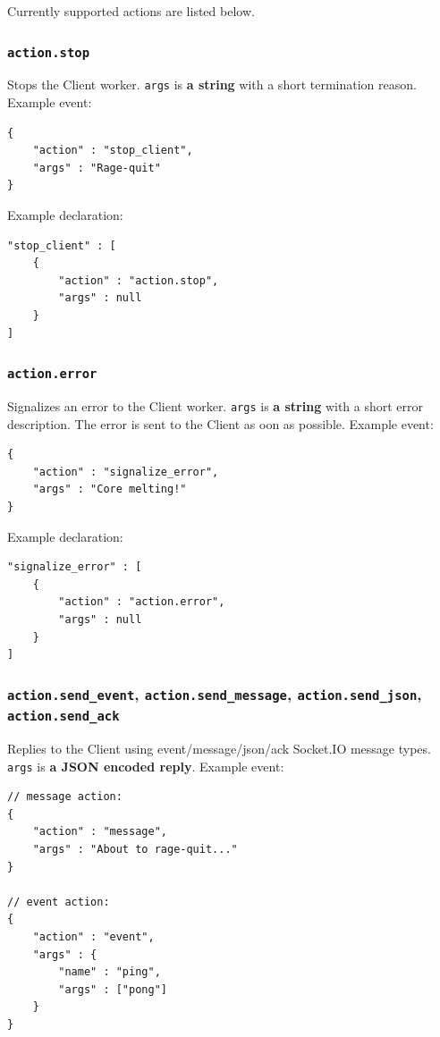 \documentclass[a4paper]{article}
\begin{document}
\noindent
Currently supported actions are listed below.
\subsubsection{\texttt{action.stop}}
\label{sec-9-3-1}

Stops the Client worker. \texttt{args} is \textbf{a string} with a short termination reason. Example event:


\begin{verbatim}
{
    "action" : "stop_client",
    "args" : "Rage-quit"
}
\end{verbatim}




\noindent
Example declaration:

\begin{verbatim}
"stop_client" : [
    {
        "action" : "action.stop",
        "args" : null
    }
]
\end{verbatim}
\subsubsection{\texttt{action.error}}
\label{sec-9-3-2}

Signalizes an error to the Client worker. \texttt{args} is \textbf{a string} with a short error description. The error is sent to the Client as oon as possible. Example event:


\begin{verbatim}
{
    "action" : "signalize_error",
    "args" : "Core melting!"
}
\end{verbatim}




\noindent
Example declaration:

\begin{verbatim}
"signalize_error" : [
    {
        "action" : "action.error",
        "args" : null
    }
]
\end{verbatim}
\subsubsection{\texttt{action.send\_event}, \texttt{action.send\_message}, \texttt{action.send\_json}, \texttt{action.send\_ack}}
\label{sec-9-3-3}

Replies to the Client using event/message/json/ack Socket.IO message types. \texttt{args} is \textbf{a JSON encoded reply}. Example event:

\begin{verbatim}
// message action:
{
    "action" : "message",
    "args" : "About to rage-quit..."
}

// event action:
{
    "action" : "event",
    "args" : {
        "name" : "ping",
        "args" : ["pong"]
    }
}
\end{verbatim}
\end{document}
